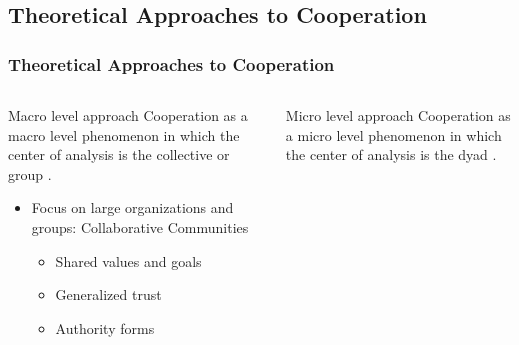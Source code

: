 \documentclass[ignorenonframetext,red,8pt,notes=hide]{beamer}
\begin{document}



\subsection{Theoretical Approaches to Cooperation}
\begin{frame}[label=]
\frametitle{Theoretical Approaches to Cooperation}

\begin{columns}[c]
\begin{column}{0.5\textwidth}

\begin{block}{Macro level approach}
Cooperation as a macro level phenomenon in which the center of analysis is the collective or group \citep{marx:1990, adler:2006, adler:2015}.

\begin{itemize}

\item Focus on large organizations and groups: Collaborative Communities

\begin{itemize}

\item Shared values and goals
\item Generalized trust
\item Authority forms

\end{itemize}
\end{itemize}
\end{block}
\end{column}

\pause

\begin{column}{0.5\textwidth}

\begin{block}{Micro level approach}
Cooperation as a micro level phenomenon in which the center of analysis is the dyad \citep{axelrod1981, watts:1999, eguiluz:2005}.

\begin{itemize}


\end{itemize}
\end{block}
\end{column}
\end{columns}
\end{frame}
\end{document}
